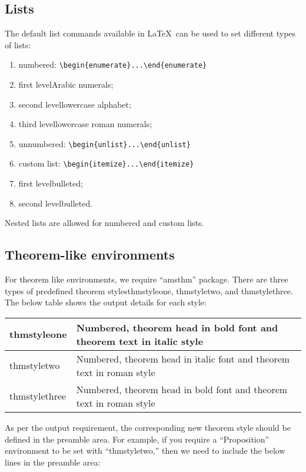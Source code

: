 \documentclass{article}
\begin{document}
\subsection{Lists}
The default list commands available in \LaTeX\ can be used to set different types of lists:

\begin{enumerate}
\item  numbered: \verb+\begin{enumerate}...\end{enumerate}+
\item[] first levelArabic numerals;
\item[]second levellowercase alphabet;
\item[]third levellowercase roman numerals;
\item  unnumbered: \verb+\begin{unlist}...\end{unlist}+
\item  custom list: \verb+\begin{itemize}...\end{itemize}+
\item[]first levelbulleted;
\item[]second levelbulleted.
\end{enumerate}
Nested lists are allowed for numbered and custom lists.

\subsection{Theorem-like environments}

For theorem like environments, we require ``amsthm'' package. There are three types of predefined theorem stylesthmstyleone, thmstyletwo, and thmstylethree. The below table shows the output details for each style:
\begin{center}\begin{tabular}{|l|p{22pc}|}
\hline thmstyleone &Numbered, theorem head in bold font and theorem text in italic style\\
\hline
thmstyletwo & Numbered, theorem head in italic font and theorem text in roman style\\
\hline
thmstylethree & Numbered, theorem head in bold font and theorem text in roman style\\
\hline
\end{tabular}\end{center}
As per the output requirement, the corresponding new theorem style should be defined in the preamble area. For example, if you require a ``Proposition'' environment to be set with ``thmstyletwo,'' then we need to include the below lines in the preamble area:
\end{document}
